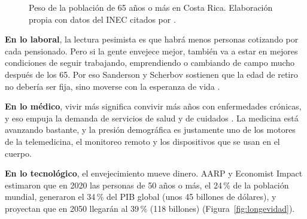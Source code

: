 \documentclass[11pt,letterpaper]{article}
\begin{document}
\begin{figure}[H]
\centering
{}
\caption{Peso de la población de 65 años o más en Costa Rica. Elaboración
propia con datos del INEC citados por \Textcite{ramirez2024}.}
\label{fig:cr}
\end{figure}

\textbf{En lo laboral}, la lectura pesimista es que habrá menos personas
cotizando por cada pensionado. Pero si la gente envejece mejor, también va a
estar en mejores condiciones de seguir trabajando, emprendiendo o cambiando de
campo mucho después de los 65. Por eso Sanderson y Scherbov sostienen que la
edad de retiro no debería ser fija, sino moverse con la esperanza de vida
\parencite{sanderson2010}.

\textbf{En lo médico}, vivir más significa convivir más años con enfermedades
crónicas, y eso empuja la demanda de servicios de salud y de cuidados
\parencite{who2024}. La medicina está avanzando bastante, y la presión
demográfica es justamente uno de los motores de la telemedicina, el monitoreo
remoto y los dispositivos que se usan en el cuerpo.

\textbf{En lo tecnológico}, el envejecimiento mueve dinero. AARP y Economist
Impact estimaron que en 2020 las personas de 50 años o más, el 24\,\% de la
población mundial, generaron el 34\,\% del PIB global (unos 45 billones de
dólares), y proyectan que en 2050 llegarán al 39\,\% (118 billones)
\parencite{aarp2022} (Figura~\ref{fig:longevidad}).
\end{document}
